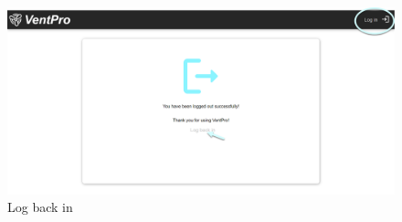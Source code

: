 \begin{figure}[h]
\centering
\includegraphics[width=1.0\textwidth]{img/Picture9}
\caption{Log back in}
\label{fig:picture_9}
\end{figure}
